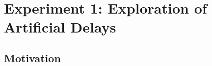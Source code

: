 \documentclass[msc,deptreport, cs]{infthesis} %
\begin{document}

\section{Experiment 1: Exploration of Artificial Delays}
\label{sec:exp1}

\subsection{Motivation}
\end{document}
